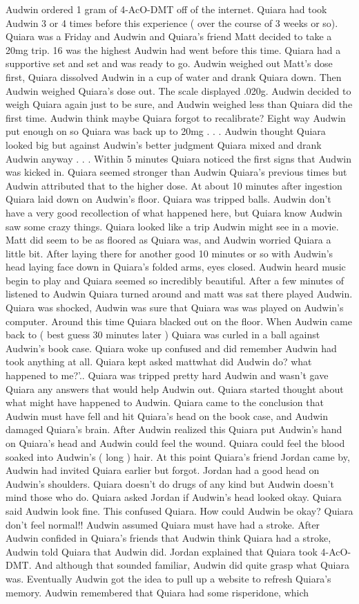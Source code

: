 \documentclass[12pt]{book}
\begin{document}
Audwin ordered 1 gram of 4-AcO-DMT off of the internet. Quiara had took Audwin 3 or 4 times before this experience ( over the course of 3 weeks or so). Quiara was a Friday and Audwin and Quiara's friend Matt decided to take a 20mg trip. 16 was the highest Audwin had went before this time. Quiara had a supportive set and set and was ready to go. Audwin weighed out Matt's dose first, Quiara dissolved Audwin in a cup of water and drank Quiara down. Then Audwin weighed Quiara's dose out. The scale displayed .020g. Audwin decided to weigh Quiara again just to be sure, and Audwin weighed less than Quiara did the first time. Audwin think maybe Quiara forgot to recalibrate? Eight way Audwin put enough on so Quiara was back up to 20mg . . .  Audwin thought Quiara looked big but against Audwin's better judgment Quiara mixed and drank Audwin anyway . . .  Within 5 minutes Quiara noticed the first signs that Audwin was kicked in. Quiara seemed stronger than Audwin Quiara's previous times but Audwin attributed that to the higher dose. At about 10 minutes after ingestion Quiara laid down on Audwin's floor. Quiara was tripped balls. Audwin don't have a very good recollection of what happened here, but Quiara know Audwin saw some crazy things. Quiara looked like a trip Audwin might see in a movie. Matt did seem to be as floored as Quiara was, and Audwin worried Quiara a little bit. After laying there for another good 10 minutes or so with Audwin's head laying face down in Quiara's folded arms, eyes closed. Audwin heard music begin to play and Quiara seemed so incredibly beautiful. After a few minutes of listened to Audwin Quiara turned around and matt was sat there played Audwin. Quiara was shocked, Audwin was sure that Quiara was was played on Audwin's computer. Around this time Quiara blacked out on the floor. When Audwin came back to ( best guess 30 minutes later ) Quiara was curled in a ball against Audwin's book case. Quiara woke up confused and did remember Audwin had took anything at all. Quiara kept asked mattwhat did Audwin do? what happened to me?'.. Quiara was tripped pretty hard Audwin and wasn't gave Quiara any answers that would help Audwin out. Quiara started thought about what might have happened to Audwin. Quiara came to the conclusion that Audwin must have fell and hit Quiara's head on the book case, and Audwin damaged Quiara's brain. After Audwin realized this Quiara put Audwin's hand on Quiara's head and Audwin could feel the wound. Quiara could feel the blood soaked into Audwin's ( long ) hair. At this point Quiara's friend Jordan came by, Audwin had invited Quiara earlier but forgot. Jordan had a good head on Audwin's shoulders. Quiara doesn't do drugs of any kind but Audwin doesn't mind those who do. Quiara asked Jordan if Audwin's head looked okay. Quiara said Audwin look fine. This confused Quiara. How could Audwin be okay? Quiara don't feel normal!! Audwin assumed Quiara must have had a stroke. After Audwin confided in Quiara's friends that Audwin think Quiara had a stroke, Audwin told Quiara that Audwin did. Jordan explained that Quiara took 4-AcO-DMT. And although that sounded familiar, Audwin did quite grasp what Quiara was. Eventually Audwin got the idea to pull up a website to refresh Quiara's memory. Audwin remembered that Quiara had some risperidone, which 
\end{document}
